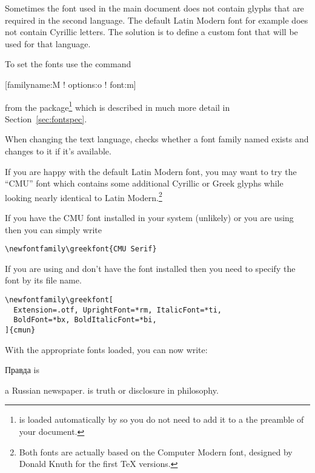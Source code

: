 Sometimes the font used in the main document does not contain glyphs that are
required in the second language. The default Latin Modern font for example does not
contain Cyrillic letters. The solution is to define a custom font that will be used
for that language.

To set the fonts use the command
\begin{lscommand}
  [familyname:M ! options:o ! font:m]
\end{lscommand}
from the  package\footnote{ is loaded automatically
  by  so you do not need to add it to a the preamble of your
  document.} which is described in much more detail in
Section~\ref{sec:fontspec}.

When changing the text language,  checks whether a font family named
 exists and changes to it if it's available.

If you are happy with the default Latin Modern font, you may want to try the \enquote{CMU} font
which contains some additional Cyrillic or Greek glyphs
while looking nearly identical to Latin Modern.\footnote{Both fonts are
  actually based on the Computer Modern font, designed by Donald Knuth for
  the first \TeX{} versions.}

If you have the CMU font installed in your system (unlikely) or you are using
 then you can simply write
\begin{verbatim}
\newfontfamily\greekfont{CMU Serif}
\end{verbatim}

If you are using  and don't have the font installed then you
need to specify the font by its file name.
\begin{verbatim}
\newfontfamily\greekfont[
  Extension=.otf, UprightFont=*rm, ItalicFont=*ti,
  BoldFont=*bx, BoldItalicFont=*bi,
]{cmun}
\end{verbatim}

With the appropriate fonts loaded, you can now write:
{
\setmonofont{cmuntt.otf}
\begin{example}[examplewidth=0.4\linewidth]
\newfontfamily{}
\newfontfamily{}

\begin{chktexignore} %
\textrussian{Правда} is
\end{chktexignore} %
a Russian newspaper.
 is truth
or disclosure in philosophy.
  \end{example}
}

